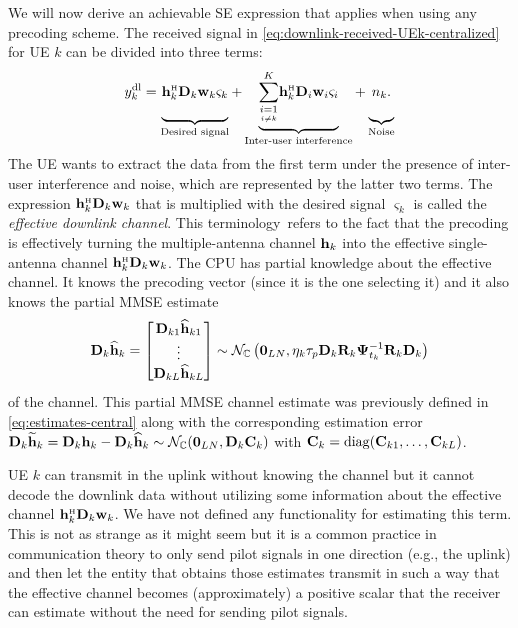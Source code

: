 We will now derive an achievable SE expression that applies when using any precoding scheme.
The received signal in \eqref{eq:downlink-received-UEk-centralized} for UE $k$ can be divided into three terms:
\begin{align} 
y_k^{\rm{dl}}=\underbrace{\vphantom{\sum_{i=1,i\ne k}^{K}} \vect{h}_{k}^{\Htran} \vect{D}_{k}  \vect{w}_{k} \varsigma_k}_{\textrm{Desired signal}} + \underbrace{\condSum{i=1}{i \neq k}{K}  \vect{h}_{k}^{\Htran}\vect{D}_{i}  \vect{w}_{i} \varsigma_i}_{\textrm{Inter-user interference}} + \underbrace{ \vphantom{\sum_{i=1,i\ne k}^{K}} n_k.}_{\textrm{Noise}} \label{eq:DCC-downlink-three-parts}
\end{align}
The UE wants to extract the data from the first term under the presence of inter-user interference and noise, which are represented by the latter two terms. The expression $\vect{h}_{k}^{\Htran} \vect{D}_{k}  \vect{w}_{k}$ that is multiplied with the desired signal $\varsigma_k$ is called the \emph{effective downlink channel}. This terminology~refers to the fact that the precoding is effectively turning the multiple-antenna channel $\mathbf{h}_{k}$ into the effective single-antenna channel $\vect{h}_{k}^{\Htran} \vect{D}_{k}  \vect{w}_{k}$. The CPU has partial knowledge about the effective channel. It knows the precoding vector (since it is the one selecting it) and it also knows the partial MMSE estimate
\begin{equation} \label{eq:estimates-central-2}
\mathbf{D}_k \widehat{\mathbf{h}}_{k} 
= \begin{bmatrix} \mathbf{D}_{k1} \widehat{\mathbf{h}}_{k1} \\ \vdots \\  \mathbf{D}_{kL} \widehat{\mathbf{h}}_{kL} 
\end{bmatrix} 
\sim \mathcal{N}_{\mathbb{C}} \left( \mathbf{0}_{LN}, \eta_k \tau_p \mathbf{D}_{k} \mathbf{R}_{k} \mathbf{\Psi}_{t_k}^{-1} \mathbf{R}_{k} \mathbf{D}_{k} \right)
\end{equation}
of the channel. This partial MMSE channel estimate was previously defined in \eqref{eq:estimates-central} along with the corresponding estimation error $\mathbf{D}_k\widetilde{\mathbf{h}}_k = \mathbf{D}_k\mathbf{h}_k - \mathbf{D}_k\widehat{\mathbf{h}}_{k} \sim \mathcal{N}_{\mathbb{C}}(\mathbf{0}_{LN},\mathbf{D}_k\mathbf{C}_k)$  with $\mathbf{C}_k = \mathrm{diag}(\mathbf{C}_{k1}, \ldots, \mathbf{C}_{kL})$.

UE $k$ can transmit in the uplink without knowing the channel but it cannot decode the downlink data without utilizing some information about the effective channel $\vect{h}_{k}^{\Htran} \vect{D}_{k}  \vect{w}_{k}$. We have not defined any functionality for estimating this term. This is not as strange as it might seem but it is a common practice in communication theory to only send pilot signals in one direction (e.g., the uplink) and then let the entity that obtains those estimates transmit in such a way that the effective channel becomes (approximately) a positive scalar that the receiver can estimate without the need for sending pilot signals.

